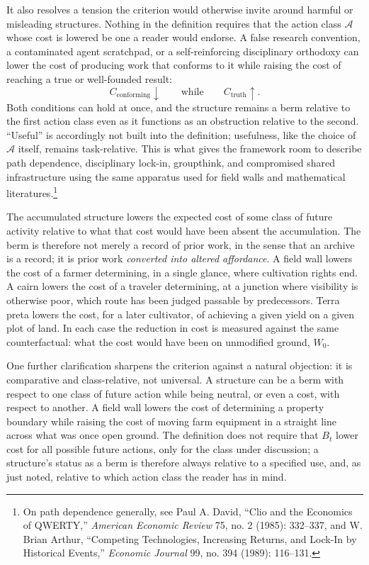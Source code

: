 \documentclass[11pt]{article}
\begin{document}
It also resolves a tension the criterion would otherwise invite around harmful or misleading structures. Nothing in the definition requires that the action class $\mathcal{A}$ whose cost is lowered be one a reader would endorse. A false research convention, a contaminated agent scratchpad, or a self-reinforcing disciplinary orthodoxy can lower the cost of producing work that conforms to it while raising the cost of reaching a true or well-founded result:
\[
C_{\text{conforming}}\downarrow
\qquad\text{while}\qquad
C_{\text{truth}}\uparrow.
\]
Both conditions can hold at once, and the structure remains a berm relative to the first action class even as it functions as an obstruction relative to the second. ``Useful'' is accordingly not built into the definition; usefulness, like the choice of $\mathcal{A}$ itself, remains task-relative. This is what gives the framework room to describe path dependence, disciplinary lock-in, groupthink, and compromised shared infrastructure using the same apparatus used for field walls and mathematical literatures.\footnote{On path dependence generally, see Paul A. David, ``Clio and the Economics of QWERTY,'' \emph{American Economic Review} 75, no. 2 (1985): 332--337, and W. Brian Arthur, ``Competing Technologies, Increasing Returns, and Lock-In by Historical Events,'' \emph{Economic Journal} 99, no. 394 (1989): 116--131.}

The accumulated structure lowers the expected cost of some class of future activity relative to what that cost would have been absent the accumulation. The berm is therefore not merely a record of prior work, in the sense that an archive is a record; it is prior work \emph{converted into altered affordance}. A field wall lowers the cost of a farmer determining, in a single glance, where cultivation rights end. A cairn lowers the cost of a traveler determining, at a junction where visibility is otherwise poor, which route has been judged passable by predecessors. Terra preta lowers the cost, for a later cultivator, of achieving a given yield on a given plot of land. In each case the reduction in cost is measured against the same counterfactual: what the cost would have been on unmodified ground, $W_0$.

One further clarification sharpens the criterion against a natural objection: it is comparative and class-relative, not universal. A structure can be a berm with respect to one class of future action while being neutral, or even a cost, with respect to another. A field wall lowers the cost of determining a property boundary while raising the cost of moving farm equipment in a straight line across what was once open ground. The definition does not require that $B_t$ lower cost for all possible future actions, only for the class under discussion; a structure's status as a berm is therefore always relative to a specified use, and, as just noted, relative to which action class the reader has in mind.
\end{document}
